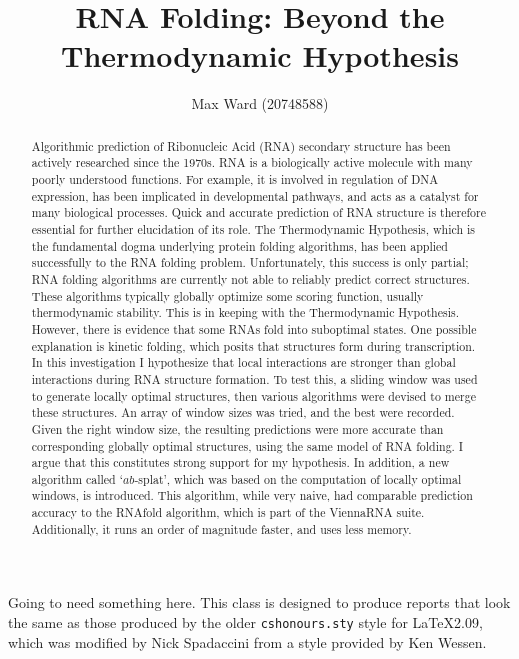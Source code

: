 \documentclass{cshonours}
\title{RNA Folding: Beyond the Thermodynamic Hypothesis}
\author{Max Ward (20748588)}
\begin{document}
\maketitle

\begin{abstract}
Algorithmic prediction of Ribonucleic Acid (RNA) secondary structure has been actively researched since the 1970s. RNA is a biologically active molecule with many poorly understood functions. For example, it is involved in regulation of DNA expression, has been implicated in developmental pathways, and acts as a catalyst for many biological processes. Quick and accurate prediction of RNA structure is therefore essential for further elucidation of its role. The Thermodynamic Hypothesis, which is the fundamental dogma underlying protein folding algorithms, has been applied successfully to the RNA folding problem. Unfortunately, this success is only partial; RNA folding algorithms are currently not able to reliably predict correct structures. These algorithms typically globally optimize some scoring function, usually thermodynamic stability. This is in keeping with the Thermodynamic Hypothesis. However, there is evidence that some RNAs fold into suboptimal states. One possible explanation is kinetic folding, which posits that structures form during transcription. In this investigation I hypothesize that local interactions are stronger than global interactions during RNA structure formation. To test this, a sliding window was used to generate locally optimal structures, then various algorithms were devised to merge these structures. An array of window sizes was tried, and the best were recorded. Given the right window size, the resulting predictions were more accurate than corresponding globally optimal structures, using the same model of RNA folding. I argue that this constitutes strong support for my hypothesis. In addition, a new algorithm called `$ab$-splat', which was based on the computation of locally optimal windows, is introduced. This algorithm, while very naive, had comparable prediction accuracy to the RNAfold algorithm, which is part of the ViennaRNA suite. Additionally, it runs an order of magnitude faster, and uses less memory.
\end{abstract}

\begin{acknowledgements}
Going to need something here.
This class is designed to produce reports that look
the same as those produced by the older {\tt cshonours.sty} style for
\LaTeX 2.09, which was modified by Nick Spadaccini from a style
provided by Ken Wessen.
\end{acknowledgements}
\end{document}
